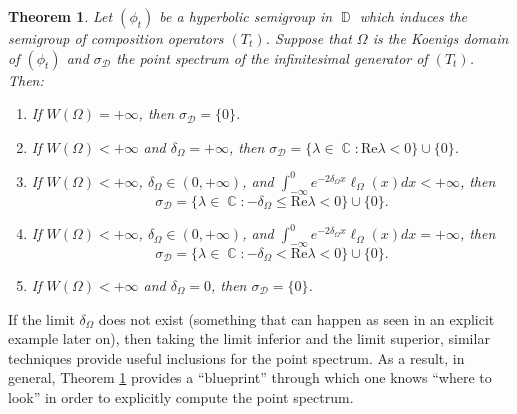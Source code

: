 \documentclass[11pt]{amsart}
\numberwithin{equation}{section}
\newtheorem{theorem}{Theorem}[section]
\theoremstyle{definition}
\DeclareMathOperator{\C}{\mathbb{C}}
\DeclareMathOperator{\D}{\mathbb{D}}
\begin{document}
	\begin{theorem}\label{thm:intro hyperbolic dirichlet}
		Let $(\phi_t)$ be a hyperbolic semigroup in $\D$ which induces the semigroup of composition operators $(T_t)$. Suppose that $\Omega$ is the Koenigs domain of $(\phi_t)$ and $\sigma_\mathcal{D}$ the point spectrum of the infinitesimal generator of $(T_t)$. Then:
		\begin{enumerate}
			\item[\textup{(a)}] If $W(\Omega)=+\infty$, then $\sigma_{\mathcal{D}}=\{0\}$.
			\item[\textup{(b)}] If $W(\Omega)<+\infty$ and $\delta_\Omega=+\infty$, then $\sigma_{\mathcal{D}}=\{\lambda\in\C:\mathrm{Re}\lambda<0\}\cup\{0\}$.
			\item[\textup{(c)}] If $W(\Omega)<+\infty$, $\delta_\Omega\in(0,+\infty)$, and $\int_{-\infty}^{0}e^{-2\delta_\Omega x}\ell_\Omega(x)dx<+\infty$, then
			$$\sigma_{\mathcal{D}}=\{\lambda\in\C:-\delta_\Omega\le\mathrm{Re}\lambda<0\}\cup\{0\}.$$
			\item[\textup{(d)}] If $W(\Omega)<+\infty$, $\delta_\Omega\in(0,+\infty)$, and $\int_{-\infty}^{0}e^{-2\delta_\Omega x}\ell_\Omega(x)dx=+\infty$, then
			$$\sigma_{\mathcal{D}}=\{\lambda\in\C:-\delta_\Omega<\mathrm{Re}\lambda<0\}\cup\{0\}.$$
			\item [\textup{(e)}] If $W(\Omega)<+\infty$ and $\delta_\Omega=0$, then $\sigma_{\mathcal{D}}=\{0\}$.
		\end{enumerate}
	\end{theorem}
	If the limit $\delta_\Omega$ does not exist (something that can happen as seen in an explicit example later on), then taking the limit inferior and the limit superior, similar techniques provide useful inclusions for the point spectrum. As a result, in general, Theorem \ref{thm:intro hyperbolic dirichlet} provides a ``blueprint'' through which one knows ``where to look'' in order to explicitly compute the point spectrum.
	
\end{document}
